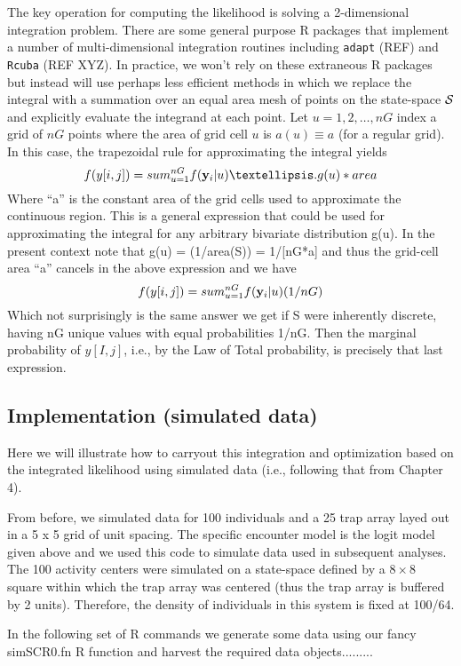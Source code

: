 The key operation for computing the likelihood is solving a
2-dimensional integration problem. There are some general purpose R
packages that implement a number of 
 multi-dimensional integration routines
including \mbox{\tt adapt} (REF) and \mbox{\tt Rcuba} (REF XYZ). In practice, we won’t rely
on these extraneous R packages but instead will use perhaps less
efficient methods in which we replace the integral with a summation
over an equal area mesh of points on the state-space ${\cal S}$ and explicitly
evaluate the integrand at each point. Let $u=1,2,\ldots,nG$ index a grid of
$nG$ points where the area of grid cell $u$ is $a(u) \equiv a$ (for a regular grid).
In this case, the trapezoidal rule
for approximating the integral yields
\[
          f(y[i,j]) = sum_{u=1}^{nG}  f( {\bold y}_{i} |u) …. g(u) *area
\]
Where “a” is the constant area of the grid cells used to approximate
the continuous region. This is a general expression that could be used
for approximating the integral for any arbitrary bivariate
distribution g(u). In the present context note that g(u) = (1/area(S))
= 1/[nG*a] and thus the grid-cell area “a” cancels in the above
expression and we have
\[
          f(y[i,j]) = sum_{u=1}^{nG}  f( {\bold y}_{i} |u) (1/nG)
\]
Which not surprisingly is the same answer we get if S were inherently
discrete, having nG unique values with equal probabilities 1/nG. Then
the marginal probability of $y[I,j]$, i.e., by the Law of Total
probability, is precisely that last expression.

\subsection{ Implementation (simulated data)}

Here we will illustrate how to carryout this integration and
optimization based on the integrated likelihood using simulated data
 (i.e., following that from Chapter 4).

From before, we simulated data for 100 individuals and a 25 trap array
layed out in a 5 x 5 grid of unit spacing.  The specific encounter
model is the logit model given above and we used this code to simulate
data used in subsequent analyses.  The 100 activity centers were
simulated on a state-space defined by a $8 \times 8$ square 
within which the
trap array was centered (thus the trap array is buffered by 2
units). Therefore, the density of individuals in this system is fixed
at 100/64.

In the following set of R commands we generate some data using our
fancy
simSCR0.fn R function and harvest the required data objects.........

